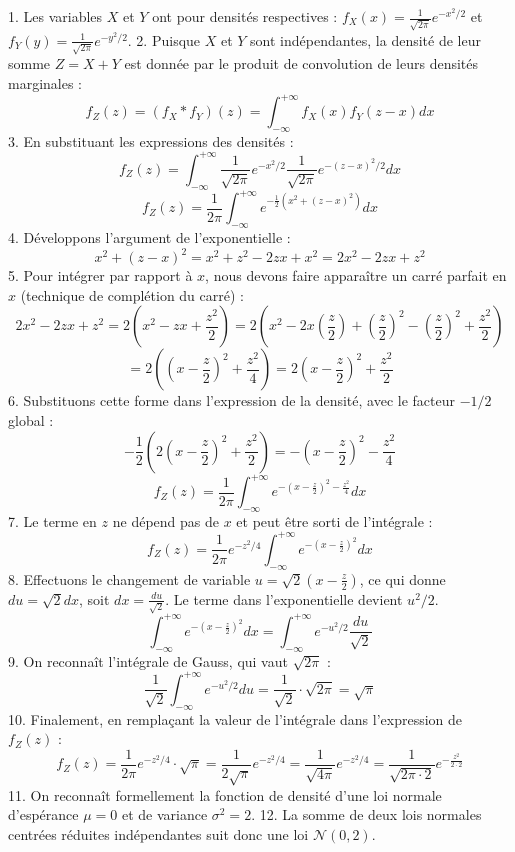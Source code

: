 \documentclass[11pt,a4paper]{article}
\begin{document}
1. Les variables $X$ et $Y$ ont pour densités respectives :
   $f_X(x) = \frac{1}{\sqrt{2\pi}} e^{-x^2/2}$ et $f_Y(y) = \frac{1}{\sqrt{2\pi}} e^{-y^2/2}$.
2. Puisque $X$ et $Y$ sont indépendantes, la densité de leur somme $Z = X+Y$ est donnée par le produit de convolution de leurs densités marginales :
   $$ f_Z(z) = (f_X * f_Y)(z) = \int_{-\infty}^{+\infty} f_X(x) f_Y(z-x) dx $$
3. En substituant les expressions des densités :
   $$ f_Z(z) = \int_{-\infty}^{+\infty} \frac{1}{\sqrt{2\pi}} e^{-x^2/2} \frac{1}{\sqrt{2\pi}} e^{-(z-x)^2/2} dx $$
   $$ f_Z(z) = \frac{1}{2\pi} \int_{-\infty}^{+\infty} e^{-\frac{1}{2}(x^2 + (z-x)^2)} dx $$
4. Développons l'argument de l'exponentielle :
   $$ x^2 + (z-x)^2 = x^2 + z^2 - 2zx + x^2 = 2x^2 - 2zx + z^2 $$
5. Pour intégrer par rapport à $x$, nous devons faire apparaître un carré parfait en $x$ (technique de complétion du carré) :
   $$ 2x^2 - 2zx + z^2 = 2\left(x^2 - zx + \frac{z^2}{2}\right) = 2\left(x^2 - 2x\left(\frac{z}{2}\right) + \left(\frac{z}{2}\right)^2 - \left(\frac{z}{2}\right)^2 + \frac{z^2}{2}\right) $$
   $$ = 2\left( \left(x - \frac{z}{2}\right)^2 + \frac{z^2}{4} \right) = 2\left(x - \frac{z}{2}\right)^2 + \frac{z^2}{2} $$
6. Substituons cette forme dans l'expression de la densité, avec le facteur $-1/2$ global :
   $$ -\frac{1}{2}\left(2\left(x - \frac{z}{2}\right)^2 + \frac{z^2}{2}\right) = -\left(x - \frac{z}{2}\right)^2 - \frac{z^2}{4} $$
   $$ f_Z(z) = \frac{1}{2\pi} \int_{-\infty}^{+\infty} e^{-\left(x - \frac{z}{2}\right)^2 - \frac{z^2}{4}} dx $$
7. Le terme en $z$ ne dépend pas de $x$ et peut être sorti de l'intégrale :
   $$ f_Z(z) = \frac{1}{2\pi} e^{-z^2/4} \int_{-\infty}^{+\infty} e^{-\left(x - \frac{z}{2}\right)^2} dx $$
8. Effectuons le changement de variable $u = \sqrt{2}\left(x - \frac{z}{2}\right)$, ce qui donne $du = \sqrt{2} dx$, soit $dx = \frac{du}{\sqrt{2}}$.
   Le terme dans l'exponentielle devient $u^2 / 2$.
   $$ \int_{-\infty}^{+\infty} e^{-\left(x - \frac{z}{2}\right)^2} dx = \int_{-\infty}^{+\infty} e^{-u^2/2} \frac{du}{\sqrt{2}} $$
9. On reconnaît l'intégrale de Gauss, qui vaut $\sqrt{2\pi}$ :
   $$ \frac{1}{\sqrt{2}} \int_{-\infty}^{+\infty} e^{-u^2/2} du = \frac{1}{\sqrt{2}} \cdot \sqrt{2\pi} = \sqrt{\pi} $$
10. Finalement, en remplaçant la valeur de l'intégrale dans l'expression de $f_Z(z)$ :
    $$ f_Z(z) = \frac{1}{2\pi} e^{-z^2/4} \cdot \sqrt{\pi} = \frac{1}{2\sqrt{\pi}} e^{-z^2/4} = \frac{1}{\sqrt{4\pi}} e^{-z^2/4} = \frac{1}{\sqrt{2\pi \cdot 2}} e^{-\frac{z^2}{2 \cdot 2}} $$
11. On reconnaît formellement la fonction de densité d'une loi normale d'espérance $\mu = 0$ et de variance $\sigma^2 = 2$.
12. La somme de deux lois normales centrées réduites indépendantes suit donc une loi $\mathcal{N}(0, 2)$.
\end{document}
